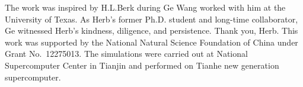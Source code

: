 \documentclass[showkeys,reprint,superscriptaddress]{revtex4-2}
\begin{document}






\begin{acknowledgments}
    The work was inspired by H.L.Berk during Ge Wang worked with him at the University of Texas.
    As Herb’s former Ph.D. student and long-time collaborator, Ge witnessed Herb’s kindness, diligence, and persistence. Thank you, Herb. 
    This work was supported by the National Natural Science Foundation of China under Grant No.~12275013.
    The simulations were carried out at National Supercomputer Center in Tianjin and  performed on Tianhe new generation supercomputer.
\end{acknowledgments}

%

\end{document}
